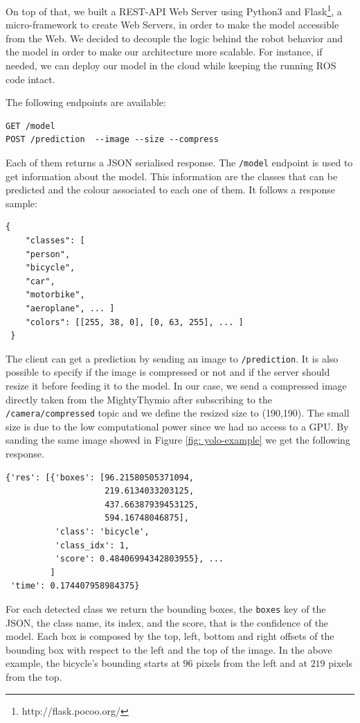 \documentclass[letterpaper, 10 pt, conference]{ieeeconf}  %
\begin{document}
On top of that, we built a REST-API Web Server using Python3 and Flask\footnote{http://flask.pocoo.org/}, a micro-framework to create Web Servers, in order to make the model accessible from the Web. We decided to decouple the logic behind the robot behavior and the model in order to make our architecture more scalable. For instance, if needed, we can deploy our model in the cloud while keeping the running ROS code intact. 

The following endpoints are available:
\begin{lstlisting}
GET /model
POST /prediction  --image --size --compress
\end{lstlisting}
Each of them returns a JSON serialised response. The \texttt{/model} endpoint is used to get information about the model. This information are the classes that can be predicted and the colour associated to each one of them. It follows a response sample:
\begin{lstlisting}
{
    "classes": [ 
    "person", 
    "bicycle", 
    "car", 
    "motorbike", 
    "aeroplane", ... ]
    "colors": [[255, 38, 0], [0, 63, 255], ... ]   
 }
\end{lstlisting}
The client can get a prediction by sending an image to \texttt{/prediction}. It is also possible to specify if the image is compressed or not and if the server should resize it before feeding it to the model. In our case, we send a compressed image directly taken from the MightyThymio after subscribing to the \texttt{/camera/compressed} topic and we define the resized size to (190,190). The small size is due to the low computational power since we had no access to a GPU. By sanding the same image showed in Figure \ref{fig: yolo-example} we get the following response.
\begin{lstlisting}
{'res': [{'boxes': [96.21580505371094,
                    219.6134033203125,
                    437.66387939453125,
                    594.16748046875],
          'class': 'bicycle',
          'class_idx': 1,
          'score': 0.48406994342803955}, ...
         ]
 'time': 0.174407958984375}
\end{lstlisting}
For each detected class we return the bounding boxes, the \texttt{boxes} key of the JSON, the class name, its index, and the score, that is the confidence of the model. Each box is composed by the top, left, bottom and right offsets of the bounding box with respect to the left and the top of the image. In the above example, the bicycle's bounding starts at $96$ pixels from the left and at $219$ pixels from the top.
\end{document}
